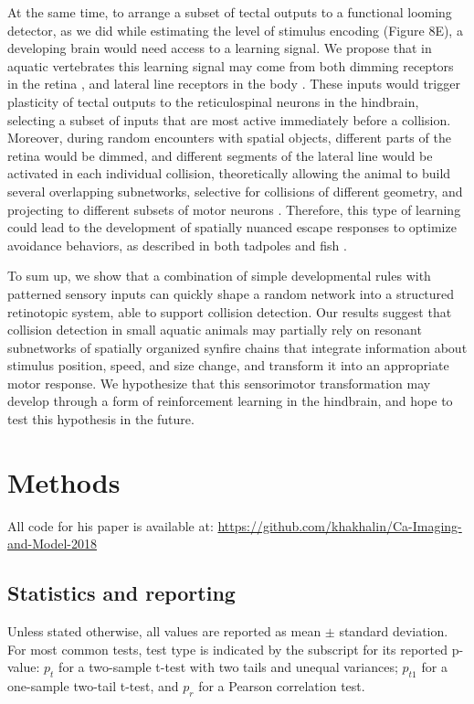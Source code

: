 \documentclass{article}
\begin{document}
At the same time, to arrange a subset of tectal outputs to a functional looming detector, as we did while estimating the level of stimulus encoding (Figure 8E), a developing brain would need access to a learning signal. We propose that in aquatic vertebrates this learning signal may come from both dimming receptors in the retina \citep{baranauskas2012}, and lateral line receptors in the body \citep{truszkowski2017}. These inputs would trigger plasticity of tectal outputs to the reticulospinal neurons in the hindbrain, selecting a subset of inputs that are most active immediately before a collision. Moreover, during random encounters with spatial objects, different parts of the retina would be dimmed, and different segments of the lateral line would be activated in each individual collision, theoretically allowing the animal to build several overlapping subnetworks, selective for collisions of different geometry, and projecting to different subsets of motor neurons \citep{helmbrecht2018topography}. Therefore, this type of learning could lead to the development of spatially nuanced escape responses to optimize avoidance behaviors, as described in both tadpoles \citep{khakhalin2014} and fish \citep{bhattacharyya2017assessment}.

To sum up, we show that a combination of simple developmental rules with patterned sensory inputs can quickly shape a random network into a structured retinotopic system, able to support collision detection. Our results suggest that collision detection in small aquatic animals may partially rely on resonant subnetworks of spatially organized synfire chains that integrate information about stimulus position, speed, and size change, and transform it into an appropriate motor response. We hypothesize that this sensorimotor transformation may develop through a form of reinforcement learning in the hindbrain, and hope to test this hypothesis in the future.

\section*{Methods}

All code for his paper is available at: \url{https://github.com/khakhalin/Ca-Imaging-and-Model-2018}

\subsection*{Statistics and reporting}

Unless stated otherwise, all values are reported as mean $\pm$ standard deviation. For most common tests, test type is indicated by the subscript for its reported p-value: $p_t$ for a two-sample t-test with two tails and unequal variances; $p_{t1}$ for a one-sample two-tail t-test, and $p_r$ for a Pearson correlation test.
\end{document}
